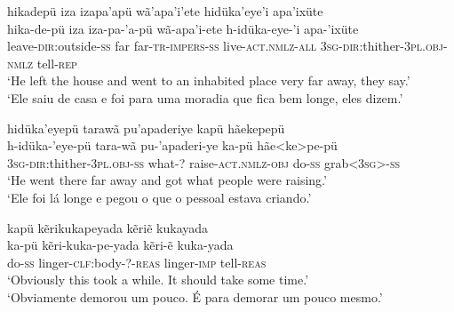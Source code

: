 \documentclass[output=paper,
modfonts,nonflat
]{langsci/langscibook}
\begin{document}
\ea  hikadepü iza izapa'apü wã'apa'i'ete hidüka'eye'i apa'ixüte  \\[.3em]
\gll 	hika-de-pü iza iza-pa-'a-pü wã-apa'i-ete h-idüka-eye-'i apa-'ixüte\\
leave-\textsc{dir:}outside-\textsc{ss} far far-\textsc{tr-impers-ss} live-\textsc{act.nmlz-all} \textsc{3sg-dir:}thither-\textsc{3pl.obj-nmlz} tell-\textsc{rep}\\
\glt    `He left the house and went to an inhabited place very far away, they say.' \\
`Ele saiu de casa e foi para uma moradia que fica bem longe, eles dizem.' \\
\z  

\ea   hidüka'eyepü tarawã pu'apaderiye kapü hãekepepü\\[.3em]
\gll 	h-idüka-'eye-pü tara-wã pu-'apaderi-ye ka-pü hãe<ke>pe-pü\\
\textsc{3sg-dir:}thither-\textsc{3pl.obj-ss} what-?{\rmfnm} raise-\textsc{act.nmlz-obj} do-\textsc{ss} grab<\textsc{3sg>-ss}\\
\glt   `He went there far away and got what people were raising.' \\
`Ele foi lá longe e pegou o que o pessoal estava criando.' \\
\z  

\newpage 
\ea  kapü kẽrikukapeyada kẽriẽ kukayada  \\[.3em]
\gll ka-pü kẽri-kuka-pe-yada kẽri-ẽ kuka-yada\\
do-\textsc{ss} linger-\textsc{clf:}body-\textsc{?-reas} linger-\textsc{imp} tell-\textsc{reas}\\
\glt  `Obviously this took a while. It should take some time.'\\
`Obviamente demorou um pouco. É para demorar um pouco mesmo.'
\z  
\end{document}
